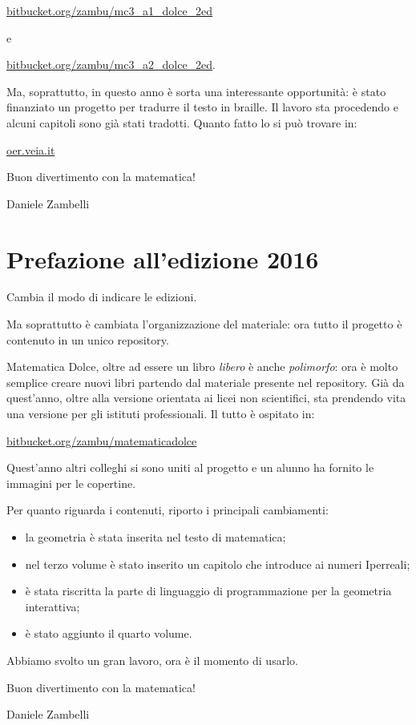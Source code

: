 \url{bitbucket.org/zambu/mc3_a1_dolce_2ed}

e 

\url{bitbucket.org/zambu/mc3_a2_dolce_2ed}. 


Ma, soprattutto, in questo anno è sorta una interessante opportunità: 
è stato finanziato un progetto per tradurre il testo in braille. 
Il lavoro sta procedendo e alcuni capitoli sono già stati tradotti. 
Quanto fatto lo si può trovare in:

\url{oer.veia.it}

Buon divertimento con la matematica!

\begin{flushright}
Daniele Zambelli
\end{flushright}

\section{Prefazione all'edizione 2016}

Cambia il modo di indicare le edizioni. 

Ma soprattutto è cambiata l'organizzazione del materiale: ora tutto il 
progetto è contenuto in un unico repository.

Matematica Dolce, oltre ad essere un libro \emph{libero} è anche 
\emph{polimorfo}: ora è molto semplice creare nuovi libri partendo dal 
materiale presente nel repository. Già da quest'anno, oltre alla versione 
orientata ai licei non scientifici, sta prendendo vita una versione per gli 
istituti professionali.
Il tutto è ospitato in:

\url{bitbucket.org/zambu/matematicadolce}

Quest'anno altri colleghi si sono uniti al progetto e un alunno ha fornito le 
immagini per le copertine.

Per quanto riguarda i contenuti, riporto i principali cambiamenti:
\begin{itemize} [nosep]
 \item la geometria è stata inserita nel testo di matematica;
 \item nel terzo volume è stato inserito un capitolo che introduce ai numeri 
Iperreali;
 \item è stata riscritta la parte di linguaggio di programmazione per la 
geometria interattiva;
 \item è stato aggiunto il quarto volume.
\end{itemize}

Abbiamo svolto un gran lavoro, ora è il momento di usarlo.

Buon divertimento con la matematica!

\begin{flushright}
Daniele Zambelli
\end{flushright}

